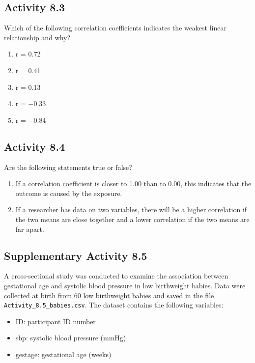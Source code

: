 \documentclass[
  a4paper,
]{memoir}
\providecommand{\tightlist}{%
  \setlength{\itemsep}{0pt}\setlength{\parskip}{0pt}}
\begin{document}
\subsection*{Activity 8.3}\label{activity-8.3}

Which of the following correlation coefficients indicates the weakest
linear relationship and why?

\begin{enumerate}
\def\labelenumi{\alph{enumi})}
\tightlist
\item
  r = 0.72
\item
  r = 0.41
\item
  r = 0.13
\item
  r = −0.33
\item
  r = −0.84
\end{enumerate}

\subsection*{Activity 8.4}\label{activity-8.4}

Are the following statements true or false?

\begin{enumerate}
\def\labelenumi{\alph{enumi})}
\tightlist
\item
  If a correlation coefficient is closer to 1.00 than to 0.00, this
  indicates that the outcome is caused by the exposure.
\item
  If a researcher has data on two variables, there will be a higher
  correlation if the two means are close together and a lower
  correlation if the two means are far apart.
\end{enumerate}

\subsection*{Supplementary Activity
8.5}\label{supplementary-activity-8.5}

A cross-sectional study was conducted to examine the association between
gestational age and systolic blood pressure in low birthweight babies.
Data were collected at birth from 60 low birthweight babies and saved in
the file \texttt{Activity\_8.5\_babies.csv}. The dataset contains the
following variables:

\begin{itemize}
\tightlist
\item
  ID: participant ID number
\item
  sbp: systolic blood pressure (mmHg)
\item
  gestage: gestational age (weeks)
\end{itemize}
\end{document}
